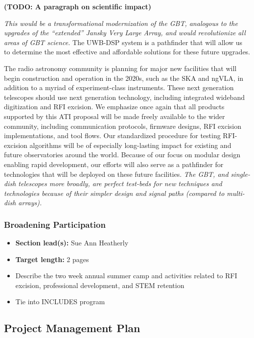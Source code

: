 \documentclass[10pt]{myNSF}
\begin{document}
\textbf{(TODO: A paragraph on scientific impact)}

\emph{This would be a transformational modernization of
  the GBT, analogous to the upgrades of the ``extended'' Jansky Very
  Large Array, and would revolutionize all areas of GBT science.}  The
UWB-DSP system is a pathfinder that will allow us to determine the
most effective and affordable solutions for these future upgrades.


The radio astronomy community is planning for major new facilities
that will begin construction and operation in the 2020s, such as the
SKA and ngVLA, in addition to a myriad of experiment-class
instruments.  These next generation telescopes should use next
generation technology, including integrated wideband digitization and
RFI excision.  We emphasize once again that all products supported by
this ATI proposal will be made freely available to the wider
community, including communication protocols, firmware designs, RFI
excision implementations, and tool flows.  Our standardized procedure
for testing RFI-excision algorithms will be of especially long-lasting
impact for existing and future observatories around the world.
Because of our focus on modular design enabling rapid development, our
efforts will also serve as a pathfinder for technologies that will be
deployed on these future facilities.  \emph{The GBT, and single-dish
  telescopes more broadly, are perfect test-beds for new techniques
  and technologies because of their simpler design and signal paths
  (compared to multi-dish arrays).}

\subsubsection{Broadening Participation}
\label{sec:participation}

\begin{itemize}
\item{\textbf{Section lead(s):} Sue Ann Heatherly}
\item{\textbf{Target length:} 2 pages}
\item{Describe the two week annual summer camp and activities related
  to RFI excision, professional development, and STEM retention}
\item{Tie into INCLUDES program}
\end{itemize}

\subsection{Project Management Plan}
\label{sec:plan}
\end{document}
